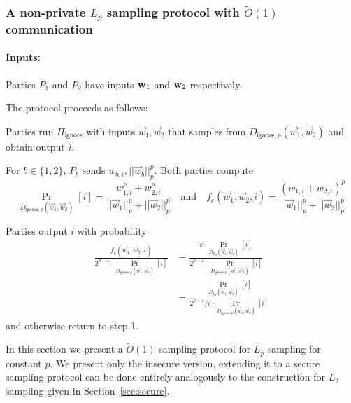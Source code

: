 \subsubsection{A non-private $L_p$ sampling protocol with $\tilde{O}(1)$
communication} \label{sec:insecureLp}

\begin{algorithm}[htbp]

\paragraph{Inputs:} Parties $P_1$ and $P_2$ have inputs $\mathbf{w}_1$ and $\mathbf{w}_2$
respectively. 

\medskip

The protocol proceeds as follows:
\BEN
    \item Parties run $\Pi_{\mathsf{ignore}}$ 
    with inputs $\vec{w}_1, \vec{w}_2$
    that samples from $D_{\mathsf{ignore}, p}(\vec{w}_1, \vec{w}_2)$ and obtain output $i$.
    
    \item For $b \in \{1, 2\}$, $P_b$ sends $w_{b,i}, ||\vec{w}_b||_p^p$.
    Both parties compute 
    \[
    \Pr_{D_{\mathsf{ignore}, p}(\vec{w}_1, \vec{w}_2)}[i] = \frac{w_{1,i}^p + w_{2,i}^p}{||\vec{w}_1||_p^p + ||\vec{w}_2||_p^p}
    \quad
    \mbox{and}
    \quad
    f_c(\vec{w}_1, \vec{w}_2, i) = \frac{(w_{1,i} + w_{2,i})^p}{||\vec{w}_1||_p^p + ||\vec{w}_2||_p^p}
    \]
    \item Parties output $i$ with probability 
    \begin{align*}
        \frac{f_c(\vec{w}_1, \vec{w}_2, i)}{2^{p-1} \cdot \Pr_{D_{\mathsf{ignore}, p}(\vec{w}_1, \vec{w}_2)}[i]} &= \frac{c \cdot \Pr_{D_{L_2}(\vec{w}_1, \vec{w}_2)}[i]}{2^{p-1} \cdot \Pr_{D_{\mathsf{ignore}, p}(\vec{w}_1, \vec{w}_2)}[i]}\\
        &= \frac{\Pr_{D_{L_2}(\vec{w}_1, \vec{w}_2)}[i]}{2^{p-1}/c \cdot \Pr_{D_{\mathsf{ignore}, p}(\vec{w}_1, \vec{w}_2)}[i]}
        \end{align*}
    and otherwise return to step 1.
    
\EEN
\caption{Protocol for exact $L_p$ sampling ($\Pi_{L_p}$)}
\label{fig:lpexact}
\end{algorithm}
In this section we present a $\tilde{O}(1)$ sampling 
protocol for $L_p$ sampling for constant $p$.
We present only the insecure version, extending it
to a secure sampling protocol can be done
entirely analogously to the construction for $L_2$ sampling
given in Section~\ref{sec:secure}.

